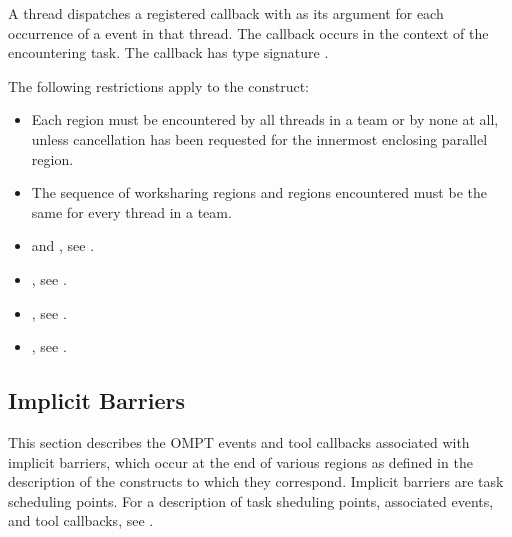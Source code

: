 A thread dispatches a registered  callback with 
 as its  argument for each occurrence 
of a  event in that thread. The callback occurs in the 
context of the encountering task. The callback has type signature
. 

\restrictions
The following restrictions apply to the  construct:

\begin{itemize}
\item Each  region must be encountered by all threads in a team 
      or by none at all, unless cancellation has been requested for the innermost 
      enclosing parallel region.
\item The sequence of worksharing regions and  regions encountered 
      must be the same for every thread in a team.
\end{itemize}

\crossreferences
\begin{itemize}
\item {} and , see
.

\item {}, see
.

\item {}, see
.

\item {}, see
.
\end{itemize}



\subsection{Implicit Barriers}
\label{subsec:implict-barrier}

This section describes the OMPT events and tool callbacks associated 
with implicit barriers, which occur at the end of various regions as
defined in the description of the constructs to which they correspond.
Implicit barriers are task scheduling points. For a description of
task sheduling points, associated events, and tool callbacks, see
.

